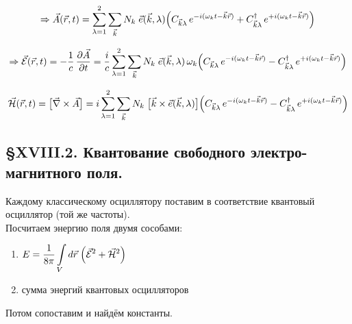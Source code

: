\[
\Rightarrow \vec{A}(\vec{r},t) = \sum_{\lambda=1}^{2}\sum_{\vec{k}} N_k\;\vec{e}(\vec{k},\lambda)\Bigl(C_{\vec{k}\lambda}\,e^{-i(\omega_k t - \vec{k}\vec{r})} + C^\dagger_{\vec{k}\lambda}\,e^{+i(\omega_k t - \vec{k}\vec{r})}\Bigr)
\]

\[
\Rightarrow \vec{\mathcal{E}}(\vec{r},t) = -\frac{1}{c}\,\frac{\partial\vec{A}}{\partial t}
= \frac{i}{c}\sum_{\lambda=1}^{2}\sum_{\vec{k}} N_k\;\vec{e}(\vec{k},\lambda)\,\omega_k\Bigl(C_{\vec{k}\lambda}\,e^{-i(\omega_k t - \vec{k}\vec{r})} - C^\dagger_{\vec{k}\lambda}\,e^{+i(\omega_k t - \vec{k}\vec{r})}\Bigr)
\]

\[
\vec{\mathcal{H}}(\vec{r},t) = \bigl[\vec{\nabla}\times\vec{A}\bigr]
= i\sum_{\lambda=1}^{2}\sum_{\vec{k}} N_k\;\bigl[\vec{k}\times\vec{e}(\vec{k},\lambda)\bigr]\Bigl(C_{\vec{k}\lambda}\,e^{-i(\omega_k t - \vec{k}\vec{r})} - C^\dagger_{\vec{k}\lambda}\,e^{+i(\omega_k t - \vec{k}\vec{r})}\Bigr)
\]

\subsection{\S XVIII.2. Квантование свободного электро-магнитного поля.}

Каждому классическому осциллятору поставим в соответствие квантовый осциллятор (той же частоты).\\

Посчитаем энергию поля двумя сособами:
\begin{enumerate}
	\item $E = \dfrac{1}{8\pi}\displaystyle\int\limits_V d\vec{r}\;\Bigl(\vec{\mathcal{E}}^2 + \vec{\mathcal{H}}^2\Bigr)$
	\item сумма энергий квантовых осцилляторов
\end{enumerate}

Потом сопоставим и найдём константы.